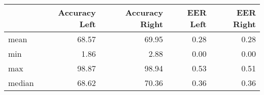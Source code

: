 \begin{tabular}{lrrrr}
\toprule
{} &  Accuracy Left &  Accuracy Right &  EER Left &  EER Right \\
\midrule
mean   &          68.57 &           69.95 &      0.28 &       0.28 \\
min    &           1.86 &            2.88 &      0.00 &       0.00 \\
max    &          98.87 &           98.94 &      0.53 &       0.51 \\
median &          68.62 &           70.36 &      0.36 &       0.36 \\
\bottomrule
\end{tabular}
